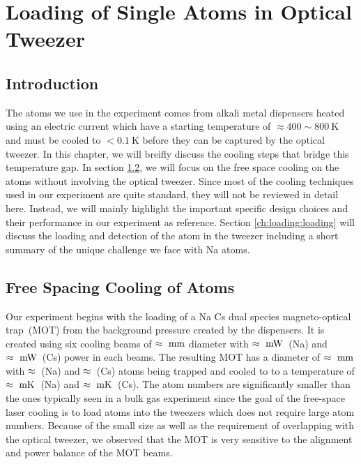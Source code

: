 
\chapter{Loading of Single Atoms in Optical Tweezer}
\label{ch:loading}

\section{Introduction}
\label{ch:loading:introduction}

The atoms we use in the experiment comes from alkali metal dispensers
heated using an electric current which have a starting temperature of
$\approx400\sim800~\mathrm{K}$ and must be cooled to $<0.1~\mathrm{K}$
before they can be captured by the optical tweezer.
In this chapter, we will breifly discuss the cooling steps that bridge this temperature gap.
In section \ref{ch:loading:free-space}, we will focus on the free space cooling
on the atoms without involving the optical tweezer.
Since most of the cooling techniques used in our experiment are quite standard,
they will not be reviewed in detail here.
Instead, we will mainly highlight the important specific design choices
and their performance in our experiment as reference.
Section \ref{ch:loading:loading} will discuss the loading and detection
of the atom in the tweezer including a short summary of the unique challenge
we face with Na atoms.

\section{Free Spacing Cooling of Atoms}
\label{ch:loading:free-space}

Our experiment begins with the loading of a Na Cs dual species magneto-optical trap~(MOT)
from the background pressure created by the dispensers.
It is created using six cooling beams of $\approx\todo{number}~\mathrm{mm}$ diameter
with $\approx\todo{number}~\mathrm{mW}$~(Na) and $\approx\todo{number}~\mathrm{mW}$~(Cs)
power in each beams.
The resulting MOT has a diameter of $\approx\todo{number}~\mathrm{mm}$
with $\approx\todo{number}$~(Na) and $\approx\todo{number}$~(Cs) atoms being trapped
and cooled to to a temperature of $\approx\todo{number}~\mathrm{mK}$~(Na)
and $\approx\todo{number}~\mathrm{mK}$~(Cs).
The atom numbers are significantly smaller than the ones typically seen in a bulk gas experiment
since the goal of the free-space laser cooling is to load atoms into the tweezers
which does not require large atom numbers.
Because of the small size as well as the requirement of overlapping with the optical tweezer,
we observed that the MOT is very sensitive to the alignment and power balance of the MOT beams.

